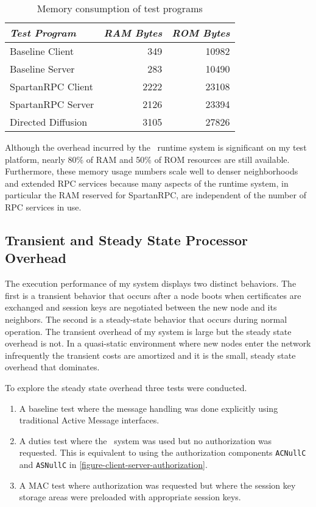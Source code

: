 \begin{table}[!t]
  \newcommand\T{\rule{0pt}{2.1ex}}
  \centering
  \caption{Memory consumption of test programs}
  {
  \begin{tabular}{|l|r|r|} \hline
    \textit{Test Program} \T & \textit{RAM Bytes} & \textit{ROM Bytes} \\
    \hline \hline

    Baseline Client    \T &  349 & 10982 \\ \hline 
    Baseline Server    \T &  283 & 10490 \\ \hline
    SpartanRPC Client  \T & 2222 & 23108 \\ \hline
    SpartanRPC Server  \T & 2126 & 23394 \\ \hline
    Directed Diffusion \T & 3105 & 27826 \\ \hline
  \end{tabular}
  }
  \label{table-test-program-ram}
\end{table}

Although the overhead incurred by the \Sprocket\ runtime system is significant on my test
platform, nearly 80\% of RAM and 50\% of ROM resources are still available. Furthermore, these
memory usage numbers scale well to denser neighborhoods and extended RPC services because many
aspects of the runtime system, in particular the RAM reserved for SpartanRPC, are independent of
the number of RPC services in use.

\subsection{Transient and Steady State Processor Overhead}
\label{section-sprocket-cpu-performance}

The execution performance of my system displays two distinct behaviors. The first is a transient
behavior that occurs after a node boots when certificates are exchanged and session keys are
negotiated between the new node and its neighbors. The second is a steady-state behavior that
occurs during normal operation. The transient overhead of my system is large but the steady
state overhead is not. In a quasi-static environment where new nodes enter the network
infrequently the transient costs are amortized and it is the small, steady state overhead that
dominates.

To explore the steady state overhead three tests were conducted.
\begin{enumerate}
\item A baseline test where the message handling was done explicitly using traditional Active
  Message interfaces.
\item A duties test where the \Sprocket\ system was used but no authorization was requested.
  This is equivalent to using the authorization components \texttt{ACNullC} and \texttt{ASNullC}
  in \autoref{figure-client-server-authorization}.
\item A MAC test where authorization was requested but where the session key storage areas were
  preloaded with appropriate session keys.
\end{enumerate}

